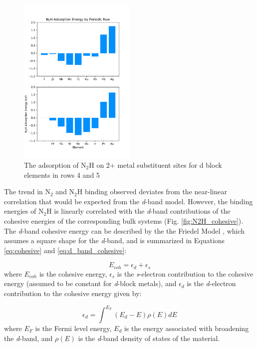 \begin{figure}
    \centering
    \includegraphics[width=0.5\textwidth]{Images/N2H_adsorption_rows.pdf}
    \caption{The adsorption of N$_2$H on 2+ metal substituent sites for d block elements in rows 4 and 5}
    \label{fig:N2H_rows}
\end{figure}

The trend in N$_2$ and N$_2$H binding observed deviates from the near-linear correlation that would be expected from the \textit{d}-band model. However, the binding energies of N$_2$H is linearly correlated with the \textit{d}-band contributions of the cohesive energies of the corresponding bulk systems (Fig. \ref{fig:N2H_cohesive}). The \textit{d}-band cohesive energy can be described by the the Friedel Model \cite{1969TPom}, which assumes a square shape for the \textit{d}-band, and is summarized in Equations \ref{eq:cohesive} and \ref{eq:d_band_cohesive}:


\begin{equation}
    E_{coh} = \epsilon_d + \epsilon_s
    \label{eq:cohesive}
\end{equation}
where $E_{coh}$ is the cohesive energy, $\epsilon_s$ is the \textit{s}-electron contribution to the cohesive energy (assumed to be constant for \textit{d}-block metals), and $\epsilon_d$ is the \textit{d}-electron contribution to the cohesive energy given by:

\begin{equation}
    \epsilon_d = \int^{E_F} (E_d-E)\rho(E)dE
    \label{eq:d_band_cohesive}
\end{equation}
where $E_F$ is the Fermi level energy, $E_d$ is the energy associated with broadening the \textit{d}-band, and $\rho(E)$ is the \textit{d}-band density of states of the material. 

